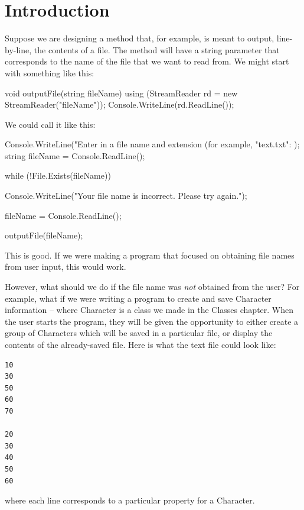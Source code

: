 \documentclass[oneside, openany] {book}
\begin{document}
\section{Introduction}
Suppose we are designing a method that, for example, is meant to output, line-by-line, the contents of a file. The method will have a string parameter that corresponds to the name of the file that we want to read from. We might start with something like this:

\begin{CSharp}
void outputFile(string fileName)
{
    using (StreamReader rd = new StreamReader("fileName"));
    {
      Console.WriteLine(rd.ReadLine());
    }
}
\end{CSharp}
We could call it like this:
\begin{CSharp}
Console.WriteLine("Enter in a file name and extension (for example, "text.txt": );
string fileName = Console.ReadLine();

while (!File.Exists(fileName))
{
  Console.WriteLine("Your file name is incorrect. Please try again.");
  
  fileName = Console.ReadLine();
}
outputFile(fileName);
\end{CSharp}
This is good. If we were making a program that focused on obtaining file names from user input, this would work.

However, what should we do if the file name was \emph{not} obtained from the user? For example, what if we were writing a program to create and save Character information -- where Character is a class we made in the Classes chapter. When the user starts the program, they will be given the opportunity to either create a group of Characters which will be saved in a particular file, or display the contents of the already-saved file. 
Here is what the text file could look like:
\begin{verbatim}
10
30
50
60
70

20
30
40
50
60
\end{verbatim}

where each line corresponds to a particular property for a Character.
\end{document}
